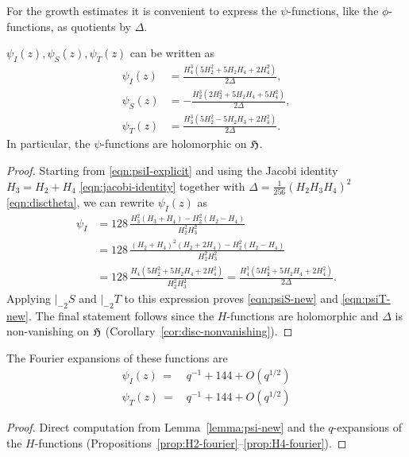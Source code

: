 For the growth estimates it is convenient to express the $\psi$-functions, like the $\phi$-functions, as quotients by $\Delta$.

\begin{lemma}\label{lemma:psi-new}
    $\psi_I(z), \psi_S(z), \psi_T(z)$ can be written as
    \begin{align}
        \psi_I(z) &= \frac{H_4^3 (5 H_2^2 + 5 H_2 H_4 + 2 H_4^2)}{2\Delta}, \label{eqn:psiI-new} \\
        \psi_S(z) &= -\frac{H_2^3 (2 H_2^2 + 5 H_2 H_4 + 5 H_4^2)}{2 \Delta}, \label{eqn:psiS-new} \\
        \psi_T(z) &= \frac{H_3^3 (5 H_2^2 - 5 H_2 H_3 + 2 H_3^2)}{2 \Delta}.\label{eqn:psiT-new}
    \end{align}
    In particular, the $\psi$-functions are holomorphic on $\mathfrak{H}$.
\end{lemma}
\begin{proof}
Starting from \eqref{eqn:psiI-explicit} and using the Jacobi identity $H_3 = H_2 + H_4$ \eqref{eqn:jacobi-identity} together with $\Delta = \frac{1}{256}(H_2 H_3 H_4)^2$ \eqref{eqn:disctheta}, we can rewrite $\psi_I(z)$ as
\begin{align}
    \psi_I &= 128\, \frac{H_3^2 (H_3 + H_4) - H_2^2 (H_2 - H_4)}{H_2^2 H_3^2} \\
    &= 128\, \frac{(H_2 + H_4)^2 (H_2 + 2 H_4) - H_2^2 (H_2 - H_4)}{H_2^2 H_3^2} \\
    &= 128\, \frac{H_4(5 H_2^2 + 5 H_2 H_4 + 2 H_4^2)}{ H_2^2 H_3^2}
    = \frac{H_4^3 (5 H_2^2 + 5 H_2 H_4 + 2 H_4^2)}{2\Delta}.
\end{align}
Applying $|_{-2}S$ and $|_{-2}T$ to this expression proves \eqref{eqn:psiS-new} and \eqref{eqn:psiT-new}.
The final statement follows since the $H$-functions are holomorphic and $\Delta$ is non-vanishing on $\mathfrak{H}$ (Corollary~\ref{cor:disc-nonvanishing}).
\end{proof}


\begin{lemma}\label{lemma:psiI-psiT-psiS-fourier}
The Fourier expansions of these functions are
\begin{align}
    \psi_I(z)\,=\,&q^{-1} + 144 + O(q^{1/2}) \label{eqn: psi fourier I}\\
    \psi_T(z)\,=\,&q^{-1} + 144 + O(q^{1/2}) \label{eqn: psi fourier T}
\end{align}
\end{lemma}
\begin{proof}
Direct computation from Lemma~\ref{lemma:psi-new} and the $q$-expansions of the $H$-functions (Propositions~\ref{prop:H2-fourier}--\ref{prop:H4-fourier}).
\end{proof}

